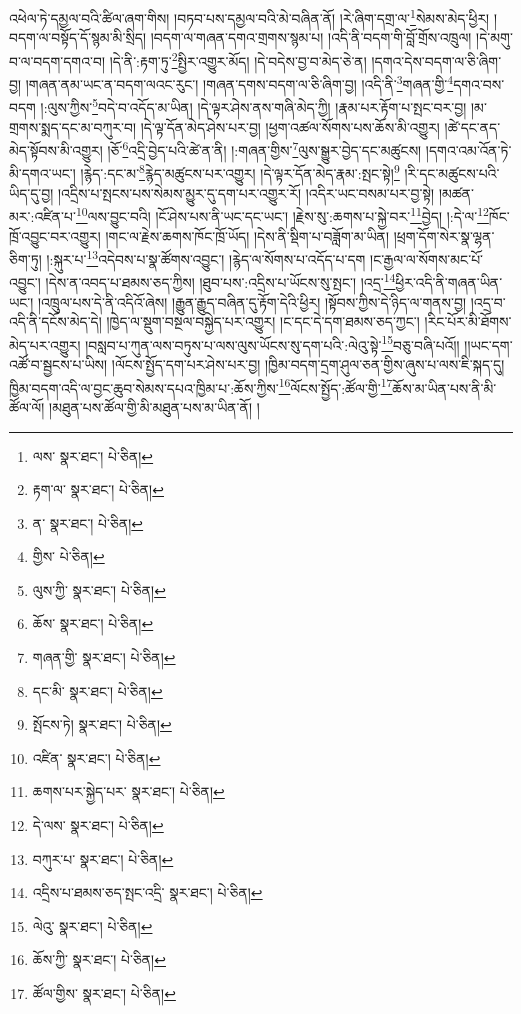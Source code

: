 འཕེལ་ཏེ་དམྱལ་བའི་ཚིལ་ཞག་གིས། །བཏབ་པས་དམྱལ་བའི་མེ་བཞིན་ནོ། །རེ་ཞིག་དགྲ་ལ་\footnote{ལས་  སྣར་ཐང་།  པེ་ཅིན། }སེམས་མེད་ཕྱིར། །བདག་ལ་བསྟོད་དོ་སྙམ་མི་སྲིད། །བདག་ལ་གཞན་དགའ་གྲགས་སྙམ་པ། །འདི་ནི་བདག་གི་བློ་གྲོས་འཁྲུལ། །དེ་མགུ་བ་ལ་བདག་དགའ་བ། །དེ་ནི་:རྟག་ཏུ་\footnote{རྟག་ལ་  སྣར་ཐང་།  པེ་ཅིན། }སྤྱིར་འགྱུར་མོད། །དེ་བདེས་བྱ་བ་མེད་ཅེ་ན། །དགའ་དེས་བདག་ལ་ཅི་ཞིག་བྱ། །གཞན་ནམ་ཡང་ན་བདག་ལའང་རུང་། །གཞན་དགས་བདག་ལ་ཅི་ཞིག་བྱ། །འདི་ནི་\footnote{ན་  སྣར་ཐང་།  པེ་ཅིན། }གཞན་གྱི་\footnote{གྱིས་  པེ་ཅིན། }དགའ་བས་བདག །:ལུས་ཀྱིས་\footnote{ལུས་ཀྱི་  སྣར་ཐང་།  པེ་ཅིན། }བདེ་བ་འདོད་མ་ཡིན། །དེ་ལྟར་ཤེས་ནས་གཞི་མེད་ཀྱི། །རྣམ་པར་རྟོག་པ་སྤང་བར་བྱ། །མ་གྲགས་སྨད་དང་མ་བཀུར་བ། །དེ་ལྟ་དོན་མེད་ཤེས་པར་བྱ། །ཕྱག་འཚལ་སོགས་པས་ཆོས་མི་འགྱུར། །ཚེ་དང་ནད་མེད་སྟོབས་མི་འགྱུར། །ཅོ་\footnote{ཆོས་  སྣར་ཐང་།  པེ་ཅིན། }འདྲི་བྱེད་པའི་ཚེ་ན་ནི། །:གཞན་གྱིས་\footnote{གཞན་གྱི་  སྣར་ཐང་།  པེ་ཅིན། }ལུས་སྒྱུར་བྱེད་དང་མཚུངས། །དགའ་འམ་འོན་ཏེ་མི་དགའ་ཡང་། །རྙེད་:དང་མ་\footnote{དང་མི་  སྣར་ཐང་།  པེ་ཅིན། }རྙེད་མཚུངས་པར་འགྱུར། །དེ་ལྟར་དོན་མེད་རྣམ་:སྤང་སྟེ།\footnote{སྤོངས་ཏེ།  སྣར་ཐང་།  པེ་ཅིན། } །རི་དང་མཚུངས་པའི་ཡིད་དུ་བྱ། །འདྲིས་པ་སྤངས་པས་སེམས་མྱུར་དུ་དག་པར་འགྱུར་རོ། །འདིར་ཡང་བསམ་པར་བྱ་སྟེ། །མཚན་མར་:འཛིན་པ་\footnote{འཛིན་  སྣར་ཐང་།  པེ་ཅིན། }ལས་བྱུང་བའི། །ངོ་ཤེས་པས་ནི་ཡང་དང་ཡང་། །རྗེས་སུ་:ཆགས་པ་སྐྱེ་བར་\footnote{ཆགས་པར་སྐྱེད་པར་  སྣར་ཐང་།  པེ་ཅིན། }བྱེད། །:དེ་ལ་\footnote{དེ་ལས་  སྣར་ཐང་།  པེ་ཅིན། }ཁོང་ཁྲོ་འབྱུང་བར་འགྱུར། །གང་ལ་རྗེས་ཆགས་ཁོང་ཁྲོ་ཡོད། །དེས་ནི་སྡིག་པ་བཟློག་མ་ཡིན། །ཕྲག་དོག་སེར་སྣ་ལྷན་ཅིག་ཏུ། །:སྐུར་པ་\footnote{བཀུར་པ་  སྣར་ཐང་།  པེ་ཅིན། }འདེབས་པ་སྣ་ཚོགས་འབྱུང་། །རྙེད་ལ་སོགས་པ་འདོད་པ་དག །ང་རྒྱལ་ལ་སོགས་མང་པོ་འབྱུང་། །དེས་ན་འབད་པ་ཐམས་ཅད་ཀྱིས། །ཐུབ་པས་:འདྲིས་པ་ཡོངས་སུ་སྤང་། །འདྲ་\footnote{འདྲིས་པ་ཐམས་ཅད་སྤང་འདྲི་  སྣར་ཐང་།  པེ་ཅིན། }ཕྱིར་འདི་ནི་གཞན་ཡིན་ཡང་། །འཁྲུལ་པས་དེ་ནི་འདིའོ་ཞེས། །རྒྱུན་རྒྱུད་བཞིན་དུ་རྟོག་དེའི་ཕྱིར། །སྟོབས་ཀྱིས་དེ་ཉིད་ལ་གནས་བྱ། །འདྲ་བ་འདི་ནི་དངོས་མེད་དེ། །ཁྱེད་ལ་སྡུག་བསྔལ་བསྐྱེད་པར་འགྱུར། །ང་དང་དེ་དག་ཐམས་ཅད་ཀྱང་། །རིང་པོར་མི་ཐོགས་མེད་པར་འགྱུར། །བསླབ་པ་ཀུན་ལས་བཏུས་པ་ལས་ལུས་ཡོངས་སུ་དག་པའི་:ལེའུ་སྟེ་\footnote{ལེའུ་  སྣར་ཐང་།  པེ་ཅིན། }བཅུ་བཞི་པའོ།། །།ཡང་དག་འཚོ་བ་སྦྱངས་པ་ཡིས། །ལོངས་སྤྱོད་དག་པར་ཤེས་པར་བྱ། །ཁྱིམ་བདག་དྲག་ཤུལ་ཅན་གྱིས་ཞུས་པ་ལས་ཇི་སྐད་དུ། ཁྱིམ་བདག་འདི་ལ་བྱང་ཆུབ་སེམས་དཔའ་ཁྱིམ་པ་:ཆོས་ཀྱིས་\footnote{ཆོས་ཀྱི་  སྣར་ཐང་།  པེ་ཅིན། }ལོངས་སྤྱོད་:ཚོལ་གྱི་\footnote{ཚོལ་གྱིས་  སྣར་ཐང་།  པེ་ཅིན། }ཆོས་མ་ཡིན་པས་ནི་མི་ཚོལ་ལོ། །མཐུན་པས་ཚོལ་གྱི་མི་མཐུན་པས་མ་ཡིན་ནོ། །
